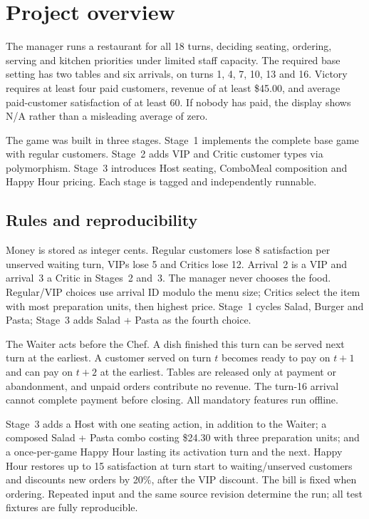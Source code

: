 \section{Project overview}
The manager runs a restaurant for all 18 turns, deciding seating, ordering,
serving and kitchen priorities under limited staff capacity. The required base
setting has two tables and six arrivals, on turns 1, 4, 7, 10, 13 and 16.
Victory requires at least four paid customers, revenue of at least \$45.00,
and average paid-customer satisfaction of at least 60. If nobody has paid,
the display shows N/A rather than a misleading average of zero.

The game was built in three stages. Stage~1 implements the complete base game
with regular customers. Stage~2 adds VIP and Critic customer types via
polymorphism. Stage~3 introduces Host seating, ComboMeal composition and
Happy Hour pricing. Each stage is tagged and independently runnable.

\subsection{Rules and reproducibility}
Money is stored as integer cents. Regular customers lose 8 satisfaction per
unserved waiting turn, VIPs lose 5 and Critics lose 12. Arrival~2 is a VIP and
arrival~3 a Critic in Stages~2 and~3. The manager never chooses the food.
Regular/VIP choices use arrival ID modulo the menu size; Critics select the
item with most preparation units, then highest price. Stage~1 cycles Salad,
Burger and Pasta; Stage~3 adds Salad + Pasta as the fourth choice.

The Waiter acts before the Chef. A dish finished this turn can be served next
turn at the earliest. A customer served on turn $t$ becomes ready to pay on
$t+1$ and can pay on $t+2$ at the earliest. Tables are released only at payment
or abandonment, and unpaid orders contribute no revenue. The turn-16 arrival
cannot complete payment before closing. All mandatory features run offline.

Stage~3 adds a Host with one seating action, in addition to the Waiter;
a composed Salad + Pasta combo costing \$24.30 with three preparation units;
and a once-per-game Happy Hour lasting its activation turn and the next.
Happy Hour restores up to 15 satisfaction at turn start to waiting/unserved
customers and discounts new orders by 20\%, after the VIP discount.
The bill is fixed when ordering. Repeated input and the same source revision
determine the run; all test fixtures are fully reproducible.
